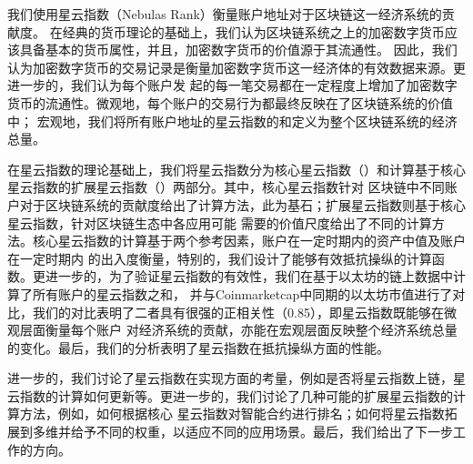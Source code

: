 我们使用星云指数（Nebulas Rank）衡量账户地址对于区块链这一经济系统的贡献度。
在经典的货币理论的基础上，我们认为区块链系统之上的加密数字货币应该具备基本的货币属性，并且，加密数字货币的价值源于其流通性。
因此，我们认为加密数字货币的交易记录是衡量加密数字货币这一经济体的有效数据来源。更进一步的，我们认为每个账户发
起的每一笔交易都在一定程度上增加了加密数字货币的流通性。微观地，每个账户的交易行为都最终反映在了区块链系统的价值中；
宏观地，我们将所有账户地址的星云指数的和定义为整个区块链系统的经济总量。

在星云指数的理论基础上，我们将星云指数分为核心星云指数（\nrcore）和计算基于核心星云指数的扩展星云指数（\nrext）两部分。其中，核心星云指数针对
区块链中不同账户对于区块链系统的贡献度给出了计算方法，此为基石；扩展星云指数则基于核心星云指数，针对区块链生态中各应用可能
需要的价值尺度给出了不同的计算方法。核心星云指数的计算基于两个参考因素，账户在一定时期内的资产中值及账户在一定时期内
的出入度衡量，特别的，我们设计了能够有效抵抗操纵的计算函数。更进一步的，为了验证星云指数的有效性，我们在基于以太坊的链上数据中计算了所有账户的星云指数之和，
并与Coinmarketcap中同期的以太坊市值进行了对比，我们的对比表明了二者具有很强的正相关性（0.85），即星云指数既能够在微观层面衡量每个账户
对经济系统的贡献，亦能在宏观层面反映整个经济系统总量的变化。最后，我们的分析表明了星云指数在抵抗操纵方面的性能。


进一步的，我们讨论了星云指数在实现方面的考量，例如是否将星云指数上链，星云指数的计算如何更新等。更进一步的，我们讨论了几种可能的扩展星云指数的计算方法，例如，如何根据核心
星云指数对智能合约进行排名；如何将星云指数拓展到多维并给予不同的权重，以适应不同的应用场景。最后，我们给出了下一步工作的方向。



